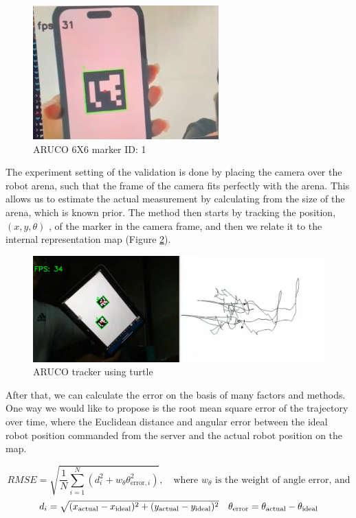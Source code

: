 \begin{figure}[H]
    \centering
    \includegraphics[width=0.3\linewidth]{assets/images/odometry/aruco.jpg}
    \caption{ARUCO 6X6 marker ID: 1}
    \label{fig:aruco-marker}
\end{figure}

The experiment setting of the validation is done by placing the camera over the robot arena, such that the frame of the camera fits perfectly with the arena. This allows us to estimate the actual measurement by calculating from the size of the arena, which is known prior. The method then starts by tracking the position,$(x, y, \theta)$  , of the marker in the camera frame, and then we relate it to the internal representation map (Figure \ref{fig:aruco-tracker}). 

\begin{figure}[H]
    \centering
    \includegraphics[width=0.9\linewidth]{assets/images/odometry/arcuo_tracker.png}
    \caption{ARUCO tracker using turtle}
    \label{fig:aruco-tracker}
\end{figure}

After that, we can calculate the error on the basis of many factors and methods. One way we would like to propose is the root mean square error of the trajectory over time, where the Euclidean distance and angular error between the ideal robot position commanded from the server and the actual robot position on the map.

\[
RMSE = \sqrt{\frac{1}{N} \sum_{i=1}^{N} (d_i^2 + w_{\theta} \theta_{\text{error}, i}^2)}, \quad \text{where } w_{\theta} \text{ is the weight of angle error, and}
\]
\[
\begin{array}{c c}
d_i = \sqrt{(x_{\text{actual}} - x_{\text{ideal}})^2 + (y_{\text{actual}} - y_{\text{ideal}})^2} & 
\theta_{\text{error}} = \theta_{\text{actual}} - \theta_{\text{ideal}}
\end{array}
\]


